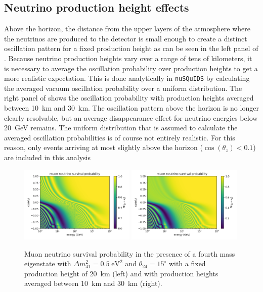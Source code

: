 \subsection{Neutrino production height effects}
Above the horizon, the distance from the upper layers of the atmosphere where the neutrinos are produced to the detector is small enough to create a distinct oscillation pattern for a fixed production height as can be seen in the left panel of . Because neutrino production heights vary over a range of tens of kilometers, it is necessary to average the oscillation probability over production heights to get a more realistic expectation. This is done analytically in \texttt{nuSQuIDS} by calculating the averaged vacuum oscillation probability over a uniform distribution. The right panel of  shows the oscillation probability with production heights averaged between 10~km and 30~km. The oscillation pattern above the horizon is no longer clearly resolvable, but an average disappearance effect for neutrino energies below 20~GeV remains. The uniform distribution that is assumed to calculate the averaged oscillation probabilities is of course not entirely realistic. For this reason, only events arriving at most slightly above the horizon ($\cos(\theta_z)<0.1$) are included in this analysis
\begin{figure}
    \centering
    \includegraphics[width=0.49\textwidth]{figures/measurement/sterile_analysis/physics/dm41_0.5eV2_th24_15deg_no_filter.png}
    \hfill
    \includegraphics[width=0.49\textwidth]{figures/measurement/sterile_analysis/physics/dm41_0.5eV2_th24_15deg_avg_height_10-30km.png}
    \caption{Muon neutrino survival probability in the presence of a fourth mass eigenstate with $\Delta m^2_{41}=0.5\;\mathrm{eV^2}$ and $\theta_{24}=15^\circ$ with a fixed production height of 20~km (left) and with production heights averaged between 10~km and 30~km (right).}
    \label{fig:numu_survival_0.5eV2_full_range}
\end{figure}

